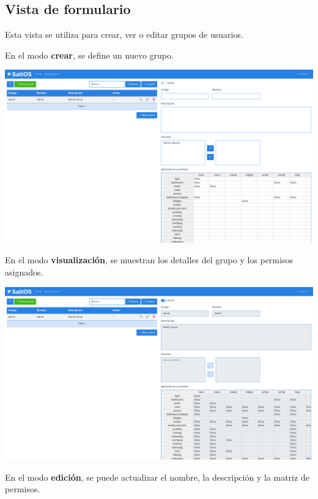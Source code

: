 \documentclass[a4paper]{article}
\begin{document}
\hypertarget{toc179}{}
\subsection{Vista de formulario}

Esta vista se utiliza para crear, ver o editar grupos de usuarios.

En el modo \textbf{crear}, se define un nuevo grupo.

\begin{center}\includegraphics[width=1\textwidth]{../ujest/snaps/test-screenshots-js-screenshots-users-groups-create-es-es-1-snap.png}\end{center}

En el modo \textbf{visualización}, se muestran los detalles del grupo y los permisos asignados.

\begin{center}\includegraphics[width=1\textwidth]{../ujest/snaps/test-screenshots-js-screenshots-users-groups-view-1-es-es-1-snap.png}\end{center}

En el modo \textbf{edición}, se puede actualizar el nombre, la descripción y la matriz de permisos.
\end{document}

